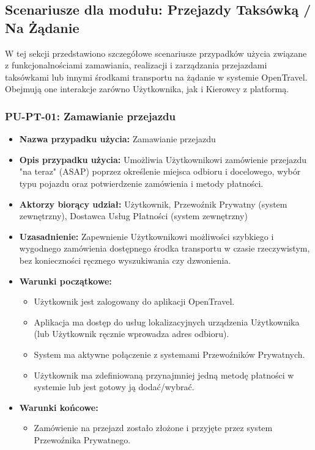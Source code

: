\documentclass[a4paper,12pt]{article}
\begin{document}
\subsection{Scenariusze dla modułu: Przejazdy Taksówką / Na Żądanie}
W tej sekcji przedstawiono szczegółowe scenariusze przypadków użycia związane z funkcjonalnościami zamawiania, realizacji i zarządzania przejazdami taksówkami lub innymi środkami transportu na żądanie w systemie OpenTravel. Obejmują one interakcje zarówno Użytkownika, jak i Kierowcy z platformą.

\subsubsection{PU-PT-01: Zamawianie przejazdu}
\begin{itemize}
    \item \textbf{Nazwa przypadku użycia:} Zamawianie przejazdu
    \item \textbf{Opis przypadku użycia:} Umożliwia Użytkownikowi zamówienie przejazdu "na teraz" (ASAP) poprzez określenie miejsca odbioru i docelowego, wybór typu pojazdu oraz potwierdzenie zamówienia i metody płatności.
    \item \textbf{Aktorzy biorący udział:} Użytkownik, Przewoźnik Prywatny (system zewnętrzny), Dostawca Usług Płatności (system zewnętrzny)
    \item \textbf{Uzasadnienie:} Zapewnienie Użytkownikowi możliwości szybkiego i wygodnego zamówienia dostępnego środka transportu w czasie rzeczywistym, bez konieczności ręcznego wyszukiwania czy dzwonienia.
    \item \textbf{Warunki początkowe:}
        \begin{itemize}
            \item Użytkownik jest zalogowany do aplikacji OpenTravel.
            \item Aplikacja ma dostęp do usług lokalizacyjnych urządzenia Użytkownika (lub Użytkownik ręcznie wprowadza adres odbioru).
            \item System ma aktywne połączenie z systemami Przewoźników Prywatnych.
            \item Użytkownik ma zdefiniowaną przynajmniej jedną metodę płatności w systemie lub jest gotowy ją dodać/wybrać.
        \end{itemize}
    \item \textbf{Warunki końcowe:}
        \begin{itemize}
            \item Zamówienie na przejazd zostało złożone i przyjęte przez system Przewoźnika Prywatnego.

\end{itemize}
\end{itemize}
\end{document}
